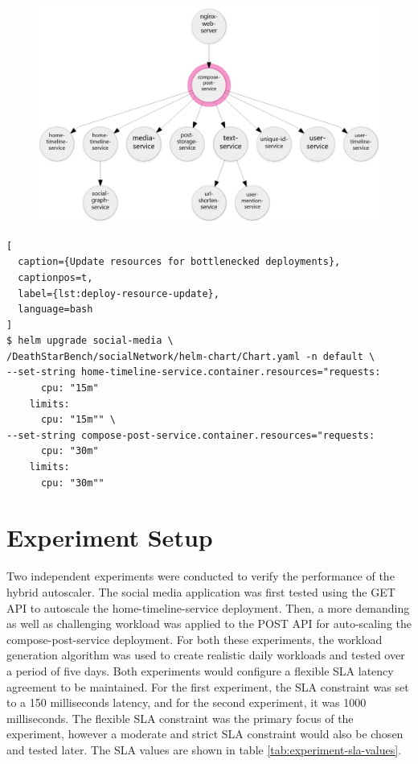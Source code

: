 \begin{figure}[htb]
\begin{minipage}{0.75\linewidth}
        \includegraphics[width=1.0\linewidth]{Figures/Compose-Post-POST-Trace.png}
    \end{minipage}
\end{figure}

\begin{lstlisting}[
  caption={Update resources for bottlenecked deployments},
  captionpos=t,
  label={lst:deploy-resource-update},
  language=bash
]
$ helm upgrade social-media \
/DeathStarBench/socialNetwork/helm-chart/Chart.yaml -n default \
--set-string home-timeline-service.container.resources="requests: 
      cpu: "15m"
    limits:
      cpu: "15m"" \
--set-string compose-post-service.container.resources="requests: 
      cpu: "30m"
    limits:
      cpu: "30m""
\end{lstlisting}

\section{Experiment Setup}
\label{sec:ch5-exp-setup}

Two independent experiments were conducted to verify the performance of the hybrid autoscaler. The social media application was first tested using the GET API to autoscale the home-timeline-service deployment. Then, a more demanding as well as challenging workload was applied to the POST API for auto-scaling the compose-post-service deployment. For both these experiments, the workload generation algorithm was used to create realistic daily workloads and tested over a period of five days. Both experiments would configure a flexible SLA latency agreement to be maintained. For the first experiment, the SLA constraint was set to a 150 milliseconds latency, and for the second experiment, it was 1000 milliseconds. The flexible SLA constraint was the primary focus of the experiment, however a moderate and strict SLA constraint would also be chosen and tested later. The SLA values are shown in table \ref{tab:experiment-sla-values}.\par

